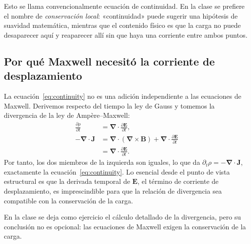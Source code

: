 Esto se llama convencionalmente ecuación de continuidad. En la clase se prefiere el nombre de \emph{conservación local}: «continuidad» puede sugerir una hipótesis de suavidad matemática, mientras que el contenido físico es que la carga no puede desaparecer aquí y reaparecer allí sin que haya una corriente entre ambos puntos.

\subsection{Por qué Maxwell necesitó la corriente de desplazamiento}

La ecuación~\eqref{eq:continuity} no es una adición independiente a las ecuaciones de Maxwell. Derivemos respecto del tiempo la ley de Gauss y tomemos la divergencia de la ley de Ampère--Maxwell:
\begin{align}
\frac{\partial\rho}{\partial t}
&=
\boldsymbol\nabla\cdot
\frac{\partial\mathbf E}{\partial t},
\\
-\boldsymbol\nabla\cdot\mathbf J
&=
\boldsymbol\nabla\cdot
(\boldsymbol\nabla\times\mathbf B)
+
\boldsymbol\nabla\cdot
\frac{\partial\mathbf E}{\partial t}
\\
&=
\boldsymbol\nabla\cdot
\frac{\partial\mathbf E}{\partial t}.
\end{align}
Por tanto, los dos miembros de la izquierda son iguales, lo que da
\(\partial_t\rho=-\boldsymbol\nabla\cdot\mathbf J\), exactamente la ecuación~\eqref{eq:continuity}. Lo esencial desde el punto de vista estructural es que la derivada temporal de \(\mathbf E\), el término de corriente de desplazamiento, es imprescindible para que la relación de divergencia sea compatible con la conservación de la carga.

\begin{classroomqa}
\end{classroomqa}

En la clase se deja como ejercicio el cálculo detallado de la divergencia, pero su conclusión no es opcional: las ecuaciones de Maxwell exigen la conservación de la carga.

